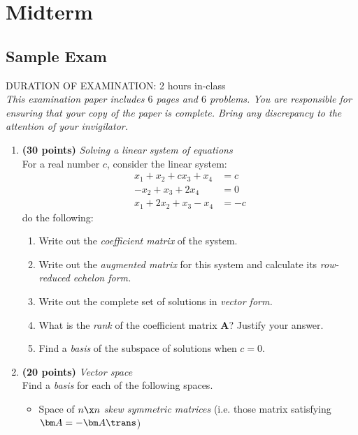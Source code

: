 
\chapter{Midterm}

\section{Sample Exam}
DURATION OF EXAMINATION: 2 hours in-class\\
\textit{This examination paper includes $6$ pages and $6$ problems. You are responsible for ensuring that
your copy of the paper is complete. Bring any discrepancy to the attention of your invigilator.}\\
\begin{enumerate}
\item \textbf{(30 points)} \textit{Solving a linear system of equations}\\
For a real number $c$, consider the linear system:
\begin{align}
x_1+x_2+cx_3+x_4&=c\\
-x_2+x_3+2x_4&=0\\
x_1+2x_2+x_3-x_4&=-c
\end{align}
do the following:
\begin{enumerate}
\item
Write out the \textit{coefficient matrix} of the system.\\
\item
Write out the \textit{augmented matrix} for this system and calculate its \textit{row-reduced echelon form.}\\
\item
Write out the complete set of solutions in \textit{vector form.}\\
\item
What is the \textit{rank} of the coefficient matrix $\bm A$? Justify your answer.\\
\item
Find a \textit{basis}  of the subspace of solutions when $c=0$.
\end{enumerate}
\newpage
\item \textbf{(20 points)} \textit{Vector space}\\
Find a \textit{basis} for each of the following spaces.
\begin{itemize}
\item
Space of $n\x n$ \textit{skew symmetric matrices} (i.e. those matrix satisfying $\bm A=-\bm A\trans$)\\

\end{itemize}
\end{enumerate}
